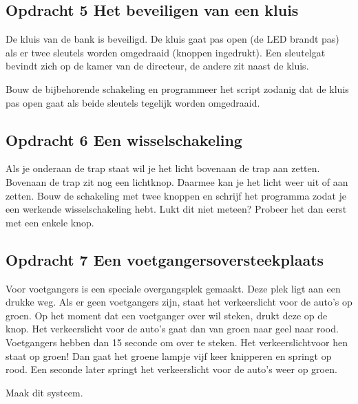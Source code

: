 \documentclass{arduino}
\begin{document}
\subsection{Opdracht 5 Het beveiligen van een kluis}

De kluis van de bank is beveiligd. De kluis gaat pas open (de LED brandt pas) als er twee sleutels worden omgedraaid (knoppen ingedrukt). Een sleutelgat bevindt zich op de kamer van de directeur, de andere zit naast de kluis.

Bouw de bijbehorende schakeling en programmeer het script zodanig dat de kluis pas open gaat als beide sleutels tegelijk worden omgedraaid.

\subsection{Opdracht 6 Een wisselschakeling}

Als je onderaan de trap staat wil je het licht bovenaan de trap aan zetten. Bovenaan de trap zit nog een lichtknop. Daarmee kan je het licht weer uit of aan zetten. Bouw de schakeling met twee knoppen en schrijf het programma zodat je een werkende wisselschakeling hebt. Lukt dit niet meteen? Probeer het dan eerst met een enkele knop. 

\subsection{Opdracht 7 Een voetgangersoversteekplaats}

Voor voetgangers is een speciale overgangsplek gemaakt. Deze plek ligt aan een drukke weg. Als er geen voetgangers zijn, staat het verkeerslicht voor de auto’s op groen. Op het moment dat een voetganger over wil steken, drukt deze op de knop. Het verkeerslicht voor de auto’s gaat dan van groen naar geel naar rood. Voetgangers hebben dan 15 seconde om over te steken. Het verkeerslichtvoor hen staat op groen! Dan gaat het groene lampje vijf keer knipperen en springt op rood. Een seconde later springt het verkeerslicht voor de auto’s weer op groen. 

Maak dit systeem.


\end{document}
